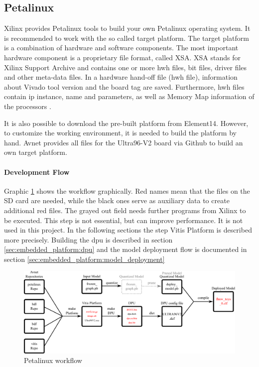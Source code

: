 \subsection{Petalinux}
\label{subsec:embedded_platform:operating_systems:petalinux}

Xilinx provides Petalinux tools to build your own Petalinux operating system.
It is recommended to work with the so called target platform.
The target platform is a combination of hardware and software components.
The most important hardware component is a proprietary file format, called XSA.
XSA stands for Xilinx Support Archive and contains one or more hwh files, bit files, driver files and other meta-data files.
In a hardware hand-off file (hwh file), information about Vivado tool version and the board tag are saved.
Furthermore, hwh files contain \acrshort{ip} instance, name and parameters, as well as Memory Map information of the processors \cite{vitis_user_guide}.

It is also possible to download the pre-built platform from Element14.
However, to customize the working environment, it is needed to build the platform by hand.
Avnet provides all files for the Ultra96-V2 board via Github to build an own target platform.

\paragraph{Development Flow}
Graphic \ref{fig:petalinux_workflow} shows the workflow graphically.
Red names mean that the files on the SD card are needed, while the black ones serve as auxiliary data to create additional red files.
The grayed out field needs further programs from Xilinx to be executed.
This step is not essential, but can improve performance.
It is not used in this project.
In the following sections the step Vitis Platform is described more precisely.
Building the \acrshort{dpu} is described in section \ref{sec:embedded_platform:dpu} and the model deployment flow is documented in section \ref{sec:embedded_platform:model_deployment}

\begin{figure}[h]
	\centering
	\includegraphics[width=1\textwidth]{graphics/workflow.pdf}
	\caption{Petalinux workflow}
	\label{fig:petalinux_workflow}
\end{figure}

